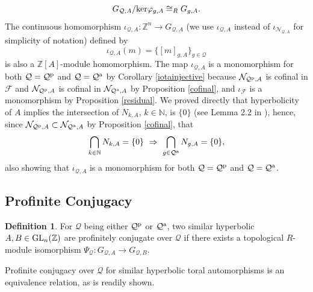 \documentclass{amsart}
\theoremstyle{plain}
\theoremstyle{definition}
\newtheorem{definition}[theorem]{Definition}
\theoremstyle{remark}
\begin{document}
\[ G_{{\mathcal Q},A}/{\rm ker} \varphi_{g,A} \cong_R G_{g,A}.\]
The continuous homomorphism $\iota_{ {\mathcal Q},A}:{\mathbb Z}^n \to G_{ {\mathcal Q},A}$ (we use $\iota_{{\mathcal Q},A}$ instead of $\iota_{ {\mathcal N}_{ {\mathcal Q},A}}$ for simplicity of notation) defined by
\[ \iota_{ {\mathcal Q},A}(m) = \{ [m]_{g,A}\}_{g\in{\mathcal Q}}\]
is also a ${\mathbb Z}[A]$-module homomorphism.  The map $\iota_{ {\mathcal Q},A}$ is a monomorphism for both ${\mathcal Q} = {\mathcal Q}^{\rm p}$ and ${\mathcal Q} = {\mathcal Q}^{\rm a}$ by Corollary \ref{iotainjective} because ${\mathcal N}_{ {\mathcal Q}^{\rm p},A}$ is cofinal in ${\mathcal F}$ and ${\mathcal N}_{ {\mathcal Q}^{\rm p},A}$ is cofinal in ${\mathcal N}_{ {\mathcal Q}^{\rm a},A}$ by Proposition \ref{cofinal}, and $\iota_{\mathcal F}$ is a monomorphism by Proposition \ref{residual}. We proved directly that hyperbolicity of $A$ implies the intersection of $N_{k,A}$, $k\in {\mathbb N}$, is $\{0\}$ (see Lemma 2.2 in \cite{BM12}), hence, since ${\mathcal N}_{ {\mathcal Q}^{\rm p},A} \subset {\mathcal N}_{ {\mathcal Q}^{\rm a},A}$ by Proposition \ref{cofinal}, that
\[ \bigcap_{k\in{\mathbb N} } N_{k,A} = \{0\} \ \Rightarrow\ \bigcap_{ g\in {\mathcal Q}^{\rm a}} N_{g,A} = \{0\},\]
also showing that $\iota_{ {\mathcal Q},A}$ is a monomorphism for both ${\mathcal Q} = {\mathcal Q}^{\rm p}$ and ${\mathcal Q} = {\mathcal Q}^{\rm a}$.



\subsection{Profinite Conjugacy}

\begin{definition} For ${\mathcal Q}$ being either ${\mathcal Q}^{\rm p}$ or ${\mathcal Q}^{\rm a}$, two similar hyperbolic $A,B\in {\rm GL}_n({\mathbb Z})$ are profinitely conjugate over ${\mathcal Q}$ if there exists a topological $R$-module isomorphism $\Psi_{\mathcal Q}:G_{ {\mathcal Q},A}\to G_{ {\mathcal Q},B}$.
\end{definition}

Profinite conjugacy over ${\mathcal Q}$ for similar hyperbolic toral automorphisms is an equivalence relation, as is readily shown. 
\end{document}
